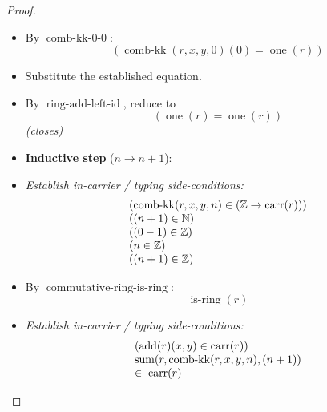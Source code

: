 \documentclass[11pt]{article}
\theoremstyle{plain}
\begin{document}
\begin{proof}
\begin{itemize}[leftmargin=2.8em, itemsep=4pt, parsep=1pt]
  \item[\textbf{11}] By $\operatorname{comb\text{-}kk\text{-}0\text{-}0}$:
\begin{equation*}
(\operatorname{comb\text{-}kk}(r, x, y, 0)(0) = \operatorname{one}(r))
\end{equation*}

  \item[\textbf{12}] Substitute the established equation.
  \item[\textbf{13--14}] By $\operatorname{ring\text{-}add\text{-}left\text{-}id}$, reduce to
\begin{equation*}
(\operatorname{one}(r) = \operatorname{one}(r))
\end{equation*}
  \emph{(closes)}
  \item[]\textbf{Inductive step} ($n \to n + 1$):
  \item[\textbf{15--24}] \emph{Establish in-carrier / typing side-conditions:}
\begin{equation*}
\begin{array}{@{}l@{}}
(\operatorname{comb\text{-}kk}(r, x, y, n) \in (\mathbb{Z} \to \operatorname{carr}(r))) \\
((n + 1) \in \mathbb{N}) \\
((0 - 1) \in \mathbb{Z}) \\
(n \in \mathbb{Z}) \\
((n + 1) \in \mathbb{Z})
\end{array}
\end{equation*}

  \item[\textbf{25}] By $\operatorname{commutative\text{-}ring\text{-}is\text{-}ring}$:
\begin{equation*}
\operatorname{is\text{-}ring}(r)
\end{equation*}

  \item[\textbf{26--27}] \emph{Establish in-carrier / typing side-conditions:}
\begin{equation*}
\begin{array}{@{}l@{}}
(\operatorname{add}(r)(x, y) \in \operatorname{carr}(r)) \\
\begin{array}{@{}l@{}} \operatorname{sum}(r, \operatorname{comb\text{-}kk}(r, x, y, n), (n + 1)) \\ \in\; \operatorname{carr}(r) \end{array}
\end{array}
\end{equation*}


\end{itemize}
\end{proof}
\end{document}
